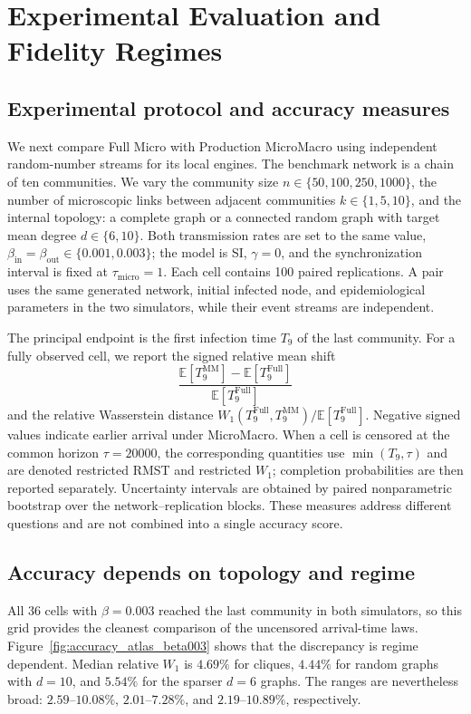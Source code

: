 \documentclass[a4paper,fleqn]{cas-sc}
\begin{document}
\section{Experimental Evaluation and Fidelity Regimes}

\subsection{Experimental protocol and accuracy measures}

We next compare Full Micro with Production MicroMacro using independent random-number streams for its local engines.  The benchmark network is a chain of ten communities.  We vary the community size $n\in\{50,100,250,1000\}$, the number of microscopic links between adjacent communities $k\in\{1,5,10\}$, and the internal topology: a complete graph or a connected random graph with target mean degree $d\in\{6,10\}$.  Both transmission rates are set to the same value, $\beta_{\mathrm{in}}=\beta_{\mathrm{out}}\in\{0.001,0.003\}$; the model is SI, $\gamma=0$, and the synchronization interval is fixed at $\tau_{\mathrm{micro}}=1$.  Each cell contains 100 paired replications.  A pair uses the same generated network, initial infected node, and epidemiological parameters in the two simulators, while their event streams are independent.

The principal endpoint is the first infection time $T_9$ of the last community.  For a fully observed cell, we report the signed relative mean shift
\[
\frac{\mathbb E[T_9^{\mathrm{MM}}]-\mathbb E[T_9^{\mathrm{Full}}]}
     {\mathbb E[T_9^{\mathrm{Full}}]}
\]
and the relative Wasserstein distance $W_1(T_9^{\mathrm{Full}},T_9^{\mathrm{MM}})/\mathbb E[T_9^{\mathrm{Full}}]$.  Negative signed values indicate earlier arrival under MicroMacro.  When a cell is censored at the common horizon $\tau=20000$, the corresponding quantities use $\min(T_9,\tau)$ and are denoted restricted RMST and restricted $W_1$; completion probabilities are then reported separately.  Uncertainty intervals are obtained by paired nonparametric bootstrap over the network--replication blocks.  These measures address different questions and are not combined into a single accuracy score.

\subsection{Accuracy depends on topology and regime}

All 36 cells with $\beta=0.003$ reached the last community in both simulators, so this grid provides the cleanest comparison of the uncensored arrival-time laws.  Figure~\ref{fig:accuracy_atlas_beta003} shows that the discrepancy is regime dependent.  Median relative $W_1$ is $4.69\%$ for cliques, $4.44\%$ for random graphs with $d=10$, and $5.54\%$ for the sparser $d=6$ graphs.  The ranges are nevertheless broad: $2.59$--$10.08\%$, $2.01$--$7.28\%$, and $2.19$--$10.89\%$, respectively.
\end{document}
